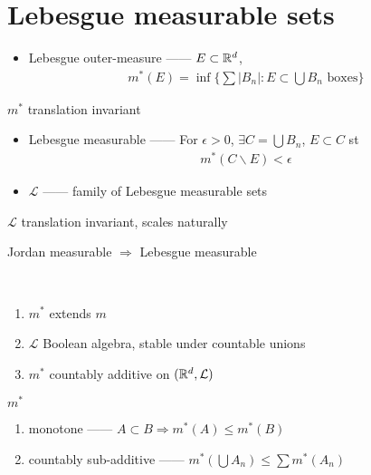 \section{Lebesgue measurable sets}\label{sec:lebesgue-measurable-sets}

\begin{itemize}
    \item Lebesgue outer-measure ------ $E \subset \mathbb{R}^d$,
    \begin{align*}
        m^{\ast}(E) = \inf \{ \sum |B_n| : E \subset \bigcup B_n \text{ boxes}\}
    \end{align*}
\end{itemize}

\begin{fact}
    $m^\ast$ translation invariant
\end{fact}

\begin{itemize}
    \item Lebesgue measurable ------ For $\epsilon > 0$, $\exists C = \bigcup B_n$, $E \subset C$ st
    \begin{align*}
        m^\ast (C \backslash E) < \epsilon
    \end{align*}
    \item $\mathcal{L}$ ------ family of Lebesgue measurable sets
\end{itemize}

\begin{fact}
    $\mathcal{L}$ translation invariant, scales naturally
\end{fact}

\begin{fact}
    Jordan measurable $\Rightarrow$ Lebesgue measurable
\end{fact}

\begin{prop}
    \,
    \begin{enumerate}
        \item $m^\ast$ extends $m$
        \item $\mathcal{L}$ Boolean algebra, stable under countable unions
        \item $m^\ast$ countably additive on $(\mathbb{R}^d, \mathcal{L})$
    \end{enumerate}
\end{prop}

\begin{lemma}
    $m^\ast$
    \begin{enumerate}
        \item monotone ------ $A \subset B \Rightarrow m^\ast(A) \leq m^\ast(B)$
        \item countably sub-additive ------ $m^\ast\left(\bigcup A_n\right) \leq \sum m^\ast(A_n)$
    \end{enumerate}
\end{lemma}

